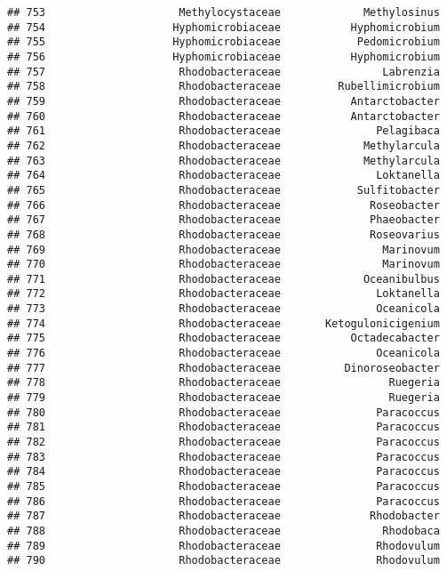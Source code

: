 \documentclass[
]{article}
\begin{document}
\begin{verbatim}
## 753                     Methylocystaceae             Methylosinus
## 754                    Hyphomicrobiaceae           Hyphomicrobium
## 755                    Hyphomicrobiaceae            Pedomicrobium
## 756                    Hyphomicrobiaceae           Hyphomicrobium
## 757                     Rhodobacteraceae                Labrenzia
## 758                     Rhodobacteraceae         Rubellimicrobium
## 759                     Rhodobacteraceae           Antarctobacter
## 760                     Rhodobacteraceae           Antarctobacter
## 761                     Rhodobacteraceae               Pelagibaca
## 762                     Rhodobacteraceae             Methylarcula
## 763                     Rhodobacteraceae             Methylarcula
## 764                     Rhodobacteraceae               Loktanella
## 765                     Rhodobacteraceae            Sulfitobacter
## 766                     Rhodobacteraceae              Roseobacter
## 767                     Rhodobacteraceae              Phaeobacter
## 768                     Rhodobacteraceae              Roseovarius
## 769                     Rhodobacteraceae                Marinovum
## 770                     Rhodobacteraceae                Marinovum
## 771                     Rhodobacteraceae             Oceanibulbus
## 772                     Rhodobacteraceae               Loktanella
## 773                     Rhodobacteraceae               Oceanicola
## 774                     Rhodobacteraceae       Ketogulonicigenium
## 775                     Rhodobacteraceae           Octadecabacter
## 776                     Rhodobacteraceae               Oceanicola
## 777                     Rhodobacteraceae          Dinoroseobacter
## 778                     Rhodobacteraceae                 Ruegeria
## 779                     Rhodobacteraceae                 Ruegeria
## 780                     Rhodobacteraceae               Paracoccus
## 781                     Rhodobacteraceae               Paracoccus
## 782                     Rhodobacteraceae               Paracoccus
## 783                     Rhodobacteraceae               Paracoccus
## 784                     Rhodobacteraceae               Paracoccus
## 785                     Rhodobacteraceae               Paracoccus
## 786                     Rhodobacteraceae               Paracoccus
## 787                     Rhodobacteraceae              Rhodobacter
## 788                     Rhodobacteraceae                Rhodobaca
## 789                     Rhodobacteraceae               Rhodovulum
## 790                     Rhodobacteraceae               Rhodovulum

\end{verbatim}
\end{document}
